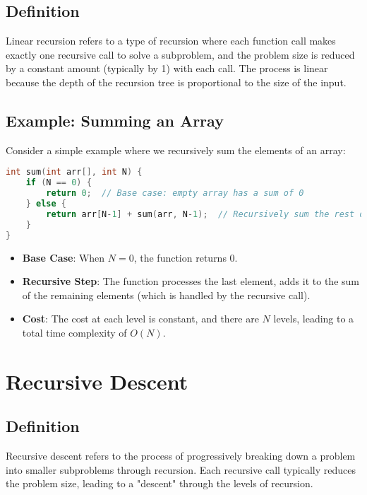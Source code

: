 \documentclass{article}
\begin{document}
\subsection{Definition}

Linear recursion refers to a type of recursion where each function call makes exactly one recursive call to solve a subproblem, and the problem size is reduced by a constant amount (typically by 1) with each call. The process is linear because the depth of the recursion tree is proportional to the size of the input.

\subsection{Example: Summing an Array}

Consider a simple example where we recursively sum the elements of an array:

\begin{lstlisting}[language=C++, caption=Summing an Array using Linear Recursion]
int sum(int arr[], int N) {
    if (N == 0) {
        return 0;  // Base case: empty array has a sum of 0
    } else {
        return arr[N-1] + sum(arr, N-1);  // Recursively sum the rest of the array
    }
}
\end{lstlisting}

\begin{itemize}
    \item \textbf{Base Case}: When $N = 0$, the function returns 0.
    \item \textbf{Recursive Step}: The function processes the last element, adds it to the sum of the remaining elements (which is handled by the recursive call).
    \item \textbf{Cost}: The cost at each level is constant, and there are $N$ levels, leading to a total time complexity of $O(N)$.
\end{itemize}

\section{Recursive Descent}

\subsection{Definition}

Recursive descent refers to the process of progressively breaking down a problem into smaller subproblems through recursion. Each recursive call typically reduces the problem size, leading to a "descent" through the levels of recursion.
\end{document}
